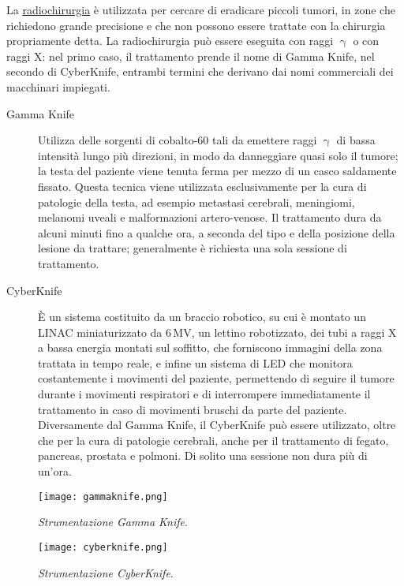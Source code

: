 \documentclass{report}
\numberwithin{equation}{section}
\numberwithin{figure}{section}
\begin{document}
La \underline{radiochirurgia} è utilizzata per cercare di eradicare piccoli tumori, in zone che richiedono grande precisione e che non possono essere trattate con la chirurgia propriamente detta. La radiochirurgia può essere eseguita con raggi $\upgamma$ o con raggi X: nel primo caso, il trattamento prende il nome di Gamma Knife, nel secondo di CyberKnife, entrambi termini che derivano dai nomi commerciali dei macchinari impiegati.
\begin{description}
    \item[Gamma Knife] Utilizza delle sorgenti di cobalto-60 tali da emettere raggi $\upgamma$ di bassa intensità lungo più direzioni, in modo da danneggiare quasi solo il tumore; la testa del paziente viene tenuta ferma per mezzo di un casco saldamente fissato. Questa tecnica viene utilizzata esclusivamente per la cura di patologie della testa, ad esempio metastasi cerebrali, meningiomi, melanomi uveali e malformazioni artero-venose. Il trattamento dura da alcuni minuti fino a qualche ora, a seconda del tipo e della posizione della lesione da trattare; generalmente è richiesta una sola sessione di trattamento.
    \item[CyberKnife] È un sistema costituito da un braccio robotico, su cui è montato un LINAC miniaturizzato da 6\,MV, un lettino robotizzato, dei tubi a raggi X a bassa energia montati sul soffitto, che forniscono immagini della zona trattata in tempo reale, e infine un sistema di LED che monitora costantemente i movimenti del paziente, permettendo di seguire il tumore durante i movimenti respiratori e di interrompere immediatamente il trattamento in caso di movimenti bruschi da parte del paziente. Diversamente dal Gamma Knife, il CyberKnife può essere utilizzato, oltre che per la cura di patologie cerebrali, anche per il trattamento di fegato, pancreas, prostata e polmoni. Di solito una sessione non dura più di un'ora.
\end{description}

\begin{figure}[htp]
\centering
\texttt{[image: gammaknife.png]}
\caption{\label{fig:gammaknife} \textit{Strumentazione Gamma Knife}.}
\end{figure}

\begin{figure}[H]
\centering
\texttt{[image: cyberknife.png]}
\caption{\label{fig:cyberknife} \textit{Strumentazione CyberKnife}.}
\end{figure}
\end{document}
